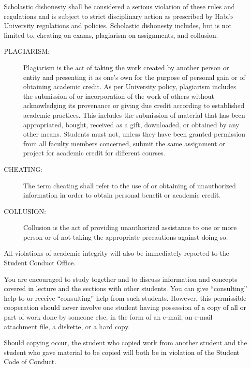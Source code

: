 \documentclass[a4paper]{article}
\begin{document}
Scholastic dishonesty shall be considered a serious violation of these rules and regulations and is subject to strict disciplinary action as prescribed by Habib University regulations and policies. Scholastic dishonesty includes, but is not limited to, cheating on exams, plagiarism on assignments, and collusion.
\begin{description}

\item[PLAGIARISM:] Plagiarism is the act of taking the work created by another person or entity and presenting it as one's own for the purpose of personal gain or of obtaining academic credit. As per University policy, plagiarism includes the submission of or incorporation of the work of others without acknowledging its provenance or giving due credit according to established academic practices. This includes the submission of material that has been appropriated, bought, received as a gift, downloaded, or obtained by any other means. Students must not, unless they have been granted permission from all faculty members concerned, submit the same assignment or project for academic credit for different courses. 

\item[CHEATING:] The term cheating shall refer to the use of or obtaining of unauthorized information in order to obtain personal benefit or academic credit. 

\item[COLLUSION:] Collusion is the act of providing unauthorized assistance to one or more person or of not taking the appropriate precautions against doing so.
\end{description}

All violations of academic integrity will also be immediately reported to the Student Conduct Office.  

You are encouraged to study together and to discuss information and concepts covered in lecture and the sections with other students. You can give ``consulting'' help to or receive ``consulting'' help from such students. However, this permissible cooperation should never involve one student having possession of a copy of all or part of work done by someone else, in the form of an e-mail, an e-mail attachment file, a diskette, or a hard copy. 

Should copying occur, the student who copied work from another student and the student who gave material to be copied will both be in violation of the Student Code of Conduct. 
\end{document}

